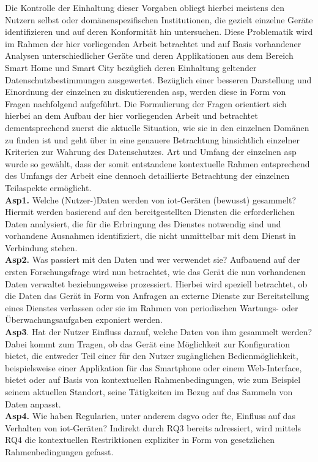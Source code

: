 \noindent Die Kontrolle der Einhaltung dieser Vorgaben obliegt hierbei meistens den Nutzern selbst oder domänenspezifischen Institutionen, die gezielt einzelne Geräte identifizieren und auf deren Konformität hin untersuchen. 
Diese Problematik wird im Rahmen der hier vorliegenden Arbeit betrachtet und auf Basis vorhandener Analysen unterschiedlicher Geräte und deren Applikationen aus dem Bereich Smart Home und Smart City bezüglich deren Einhaltung geltender Datenschutzbestimmungen ausgewertet. Bezüglich einer besseren Darstellung und Einordnung der einzelnen zu diskutierenden \ac{asp}, werden diese in Form von Fragen nachfolgend aufgeführt.
Die Formulierung der Fragen orientiert sich hierbei an dem Aufbau der hier vorliegenden Arbeit und betrachtet dementsprechend zuerst die aktuelle Situation, wie sie in den einzelnen Domänen zu finden ist und geht über in eine genauere Betrachtung hinsichtlich einzelner Kriterien zur Wahrung des Datenschutzes. Art und Umfang der einzelnen \acl{asp} wurde so gewählt, dass der somit entstandene kontextuelle Rahmen entsprechend des Umfangs der Arbeit eine dennoch detaillierte Betrachtung der einzelnen Teilaspekte ermöglicht.\\
\textbf{Asp1.} Welche (Nutzer-)Daten werden von \ac{iot}-Geräten (bewusst) gesammelt? Hiermit werden basierend auf den bereitgestellten Diensten die erforderlichen Daten analysiert, die für die Erbringung des Dienstes notwendig sind und vorhandene Ausnahmen identifiziert, die nicht unmittelbar mit dem Dienst in Verbindung stehen.\\
\textbf{Asp2.} Was passiert mit den Daten und wer verwendet sie? Aufbauend auf der ersten Forschungsfrage wird nun betrachtet, wie das Gerät die nun vorhandenen Daten verwaltet beziehungsweise prozessiert. Hierbei wird speziell betrachtet, ob die Daten das Gerät in Form von Anfragen an externe Dienste zur Bereitstellung eines Dienstes verlassen oder sie im Rahmen von periodischen Wartungs- oder Überwachungsaufgaben exponiert werden.\\
\textbf{Asp3}. Hat der Nutzer Einfluss darauf, welche Daten von ihm gesammelt werden? Dabei kommt zum Tragen, ob das Gerät eine Möglichkeit zur Konfiguration bietet, die entweder Teil einer für den Nutzer zugänglichen Bedienmöglichkeit, beispielsweise einer Applikation für das Smartphone oder einem Web-Interface, bietet oder auf Basis von kontextuellen Rahmenbedingungen, wie zum Beispiel seinem aktuellen Standort, seine Tätigkeiten im Bezug auf das Sammeln von Daten anpasst.\\
\textbf{Asp4.} Wie haben Regularien, unter anderem \ac{dsgvo} oder \ac{ftc}, Einfluss auf das Verhalten von \ac{iot}-Geräten? Indirekt durch RQ3 bereits adressiert, wird mittels RQ4 die kontextuellen Restriktionen expliziter in Form von gesetzlichen Rahmenbedingungen gefasst.\\
